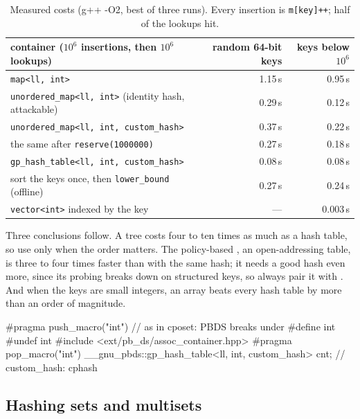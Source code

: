 \begin{table}[htbp]
\centering\small
\begin{tabular}{@{}lrr@{}}
\toprule
container ($10^6$ insertions, then $10^6$ lookups) & random 64-bit keys & keys below $10^6$ \\
\midrule
\texttt{map<ll, int>} & 1.15\,s & 0.95\,s \\
\texttt{unordered\_map<ll, int>} (identity hash, attackable) & 0.29\,s & 0.12\,s \\
\texttt{unordered\_map<ll, int, custom\_hash>} & 0.37\,s & 0.22\,s \\
\quad the same after \texttt{reserve(1000000)} & 0.27\,s & 0.18\,s \\
\texttt{gp\_hash\_table<ll, int, custom\_hash>} & 0.08\,s & 0.08\,s \\
sort the keys once, then \texttt{lower\_bound} (offline) & 0.27\,s & 0.24\,s \\
\texttt{vector<int>} indexed by the key & --- & 0.003\,s \\
\bottomrule
\end{tabular}
\caption{Measured costs (g++ -O2, best of three runs). Every insertion is \texttt{m[key]++}; half of the lookups hit.}
\label{tab:dicts}
\end{table}

Three conclusions follow. A tree costs four to ten times as much as a hash table, so use  only when the order matters. The
policy-based , an open-addressing table, is three to four times faster than  with the same hash;
it needs a good hash even more, since its probing breaks down on structured keys, so always pair it with . And when the
keys are small integers, an array beats every hash table by more than an order of magnitude.

\begin{code}
#pragma push_macro("int")  // as in cposet: PBDS breaks under #define int
#undef int
#include <ext/pb_ds/assoc_container.hpp>
#pragma pop_macro("int")
__gnu_pbds::gp_hash_table<ll, int, custom_hash> cnt;  // custom_hash: cphash
\end{code}


\subsection{Hashing sets and multisets}\label{sec:xorhash}

